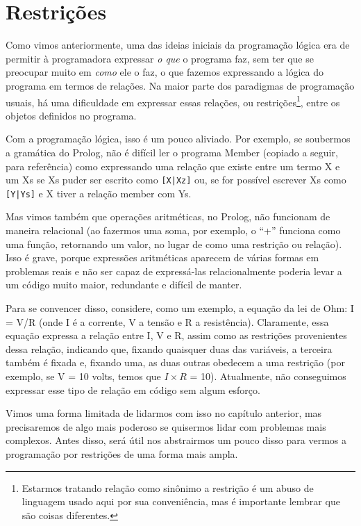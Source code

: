 \documentclass{article}
\theoremstyle{remark}
\theoremstyle{theorem}
\begin{document}
\section{Restrições}

Como vimos anteriormente, uma das ideias iniciais da programação lógica era de permitir à programadora expressar \textit{o que} o programa faz, sem ter que se preocupar muito em \textit{como} ele o faz, o que fazemos expressando a lógica do programa em termos de relações. Na maior parte dos paradigmas de programação usuais, há uma dificuldade em expressar essas relações, ou restrições\footnote{Estarmos tratando relação como sinônimo a restrição é um abuso de linguagem usado aqui por sua conveniência, mas é importante lembrar que são coisas diferentes.}, entre os objetos definidos no programa.

Com a programação lógica, isso é um pouco aliviado. Por exemplo, se soubermos a gramática do Prolog, não é difícil ler o programa Member (copiado a seguir, para referência) como expressando uma relação que existe entre um termo X e um Xs se Xs puder ser escrito como {\tt[X|Xz]} ou, se for possível escrever Xs como {\tt [Y|Ys]} e X tiver a relação member com Ys.



Mas vimos também que operações aritméticas, no Prolog, não funcionam de maneira relacional (ao fazermos uma soma, por exemplo, o ``+'' funciona como uma função, retornando um valor, no lugar de como uma restrição ou relação). Isso é grave, porque expressões aritméticas aparecem de várias formas em problemas reais e não ser capaz de expressá-las relacionalmente poderia levar a um código muito maior, redundante e difícil de manter.

Para se convencer disso, considere, como um exemplo, a equação da lei de Ohm: I = V/R (onde I é a
corrente, V a tensão e R a resistência).
Claramente, essa equação expressa a relação entre I, V e R, assim como as restrições provenientes dessa relação, indicando que, fixando quaisquer duas das variáveis, a terceira também é fixada e, fixando uma, as duas outras obedecem a uma restrição (por exemplo, se V = 10 volts, temos que $I \times R$ = 10). Atualmente, não conseguimos expressar esse tipo de relação em código sem algum esforço.

Vimos uma forma limitada de lidarmos com isso no capítulo anterior, %
mas precisaremos de algo mais poderoso se quisermos lidar com problemas mais complexos. Antes disso, será útil nos abstrairmos um pouco disso para vermos a programação por restrições de uma forma mais ampla.
\end{document}
